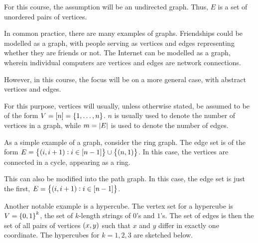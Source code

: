 \documentclass[11pt]{article}
\begin{document}
For this course, the assumption will be an undirected graph.
Thus, $E$ is a set of unordered pairs of vertices.

In common practice, there are many examples of graphs.
Friendships could be modelled as a graph,
with people serving as vertices
and edges representing whether they are friends or not.
The Internet can be modelled as a graph,
wherein individual computers are vertices
and edges are network connections.

However, in this course,
the focus will be on a more general case,
with abstract vertices and edges.

For this purpose, vertices will usually, unless otherwise stated,
be assumed to be of the form $V=\sqparen{n}=\set{1,\ldots,n}$.
$n$ is usually used to denote the number of vertices in a graph,
while $m=\left| E \right|$ is used to denote the number of edges.

As a simple example of a graph, consider the ring graph.
The edge set is of the form
$E=\set{\paren{i,i+1}:i\in\sqparen{n-1}}\cup\set{\paren{n,1}}$.
In this case, the vertices are connected in a cycle,
appearing as a ring.

\begin{center}
\end{center}

This can also be modified into the path graph.
In this case, the edge set is just the first,
$E=\set{\paren{i,i+1}:i\in\sqparen{n-1}}$.

\begin{center}
\end{center}

Another notable example is a hypercube.
The vertex set for a hypercube is $V=\left\{0,1\right\}^{k}$,
the set of $k$-length strings of $0$'s and $1$'s.
The set of edges is then the set of all pairs of vertices $\paren{x,y}$
such that $x$ and $y$ differ in exactly one coordinate.
The hypercubes for $k=1,2,3$ are sketched below.
\begin{center}
\end{center}
\end{document}
